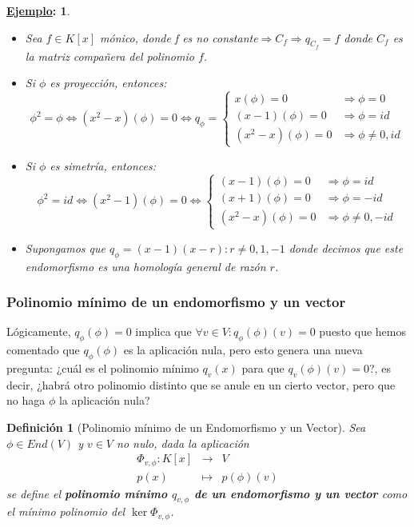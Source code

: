 \documentclass[10pt,a4paper,openright]{book}
\theoremstyle{break}
\newtheorem*{defi}{Definición}
\newtheorem*{ej}{\underline{Ejemplo}:}
\begin{document}
\begin{ej}
\begin{itemize}
\item Sea $f\in K[x]$ mónico, donde f es no constante$\Rightarrow C_f\Rightarrow q_{C_f}=f$ donde $C_f$ es la matriz compañera del polinomio $f$.

\item Si $\phi$ es proyección, entonces:
$$\phi^2= \phi\Leftrightarrow (x^2-x)(\phi)= 0\Leftrightarrow q_\phi = \begin{cases} x(\phi) = 0 & \Rightarrow \phi = 0 \\ (x-1)(\phi) = 0 & \Rightarrow\phi = id \\ (x^2-x)(\phi) = 0 & \Rightarrow\phi \neq 0,id\end{cases}$$

\item Si $\phi$ es simetría, entonces:
$$\phi^2=id\Leftrightarrow (x^2-1)(\phi)=0\Leftrightarrow \begin{cases} (x-1)(\phi) = 0 & \Rightarrow \phi = id \\ (x+1)(\phi) = 0 & \Rightarrow \phi = -id \\ (x^2-x)(\phi) = 0 & \Rightarrow\phi \neq 0,-id\end{cases}$$

\item Supongamos que $q_\phi = (x-1)(x-r): r\neq 0, 1, -1$ donde decimos que este endomorfismo es una homología general de razón $r$.
\end{itemize}
\end{ej}

\subsubsection{Polinomio mínimo de un endomorfismo y un vector}
Lógicamente, $q_\phi(\phi) = 0 $ implica que $\forall v\in V : q_\phi(\phi)(v) = 0$ puesto que hemos comentado que $q_\phi(\phi)$ es la aplicación nula, pero esto genera una nueva pregunta: ¿cuál es el polinomio mínimo $q_v(x)$ para que $q_v(\phi)(v) = 0$?, es decir, ¿habrá otro polinomio distinto que se anule en un cierto vector, pero que no haga $\phi$ la aplicación nula?

\begin{defi}[Polinomio mínimo de un Endomorfismo y un Vector]
Sea $\phi\in End(V)$ y $v\in V$ no nulo, dada la aplicación 
\begin{eqnarray*}
\Phi_{v, \phi}: K[x] &\longrightarrow& V \\ p(x) &\longmapsto& p(\phi)(v) 
\end{eqnarray*}
se define el \textbf{polinomio mínimo $q_{v, \phi}$ de un endomorfismo y un vector} como el mínimo polinomio del $\ker \Phi_{v,\phi}$.
\end{defi}
\end{document}
